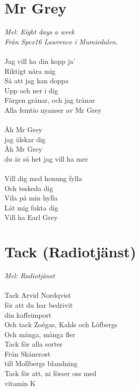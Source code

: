 \documentclass[a5paper,15pt]{article}
\begin{document}
\section{Mr Grey}
\emph{Mel: Eight days a week}\\
\emph{Från Spex16 Lawrence i Mumiedalen.}\\
\\
Jag vill ha din kopp ja'\\
Riktigt nära mig\\
Så att jag kan doppa\\
Upp och ner i dig\\
Färgen grånar, och jag trånar\\
Alla femtio nyanser av Mr Grey\\
\\
Åh Mr Grey \\jag älskar dig\\
Åh Mr Grey \\du är så het jag vill ha mer\\
\\
Vill dig med honung fylla\\
Och teskeda dig\\
Vila på min hylla\\
Låt mig fukta dig\\
Vill ha Earl Grey

\section{Tack (Radiotjänst)}
\emph{Mel: Radiotjänst}\\
\\
Tack Arvid Nordqvist\\
för att du har bedrivit \\din kaffeimport\\
Och tack Zoégas, Kahls och Löfbergs\\
Och många, många fler\\
Tack för alla sorter\\
Från Skånerost \\till Mollbergs blandning\\
Tack för att, ni förser oss med \\vitamin K\\
\\
\end{document}
